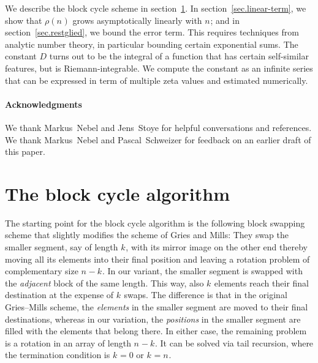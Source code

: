 \documentclass[12pt,a4paper]{article}
\newcommand{\Size}[1][]{n_{#1}}
\newcommand{\Shift}[1][]{k_{#1}}
\newcommand{\AvgCostOf}[1]{\rho(#1)}
\begin{document}
  We describe the block cycle scheme in section~\ref{sec.algorithm}.
  In section~\ref{sec.linear-term}, we show that $\AvgCostOf{\Size}$
  grows asymptotically linearly with $\Size$; and in
  section~\ref{sec.restglied}, we bound the error term.  This requires
  techniques from analytic number theory, in particular bounding certain
  exponential sums. The constant $D$ turns out to be the integral of
  a function that has certain self-similar features, but is
  Riemann-integrable. We compute the constant as an infinite series that
  can be expressed in term of multiple zeta values and estimated
  numerically.

  \paragraph{Acknowledgments}
  We thank Markus~Nebel and Jens~Stoye for helpful conversations and
  references. We thank Markus~Nebel and Pascal~Schweizer for feedback on
  an earlier draft of this paper.

  
  \section{The block cycle algorithm}\label{sec.algorithm}
  The starting point for the block cycle algorithm is the following
  block swapping scheme that slightly modifies the scheme of Gries and
  Mills: They swap the smaller segment, say of length $\Shift$, with its
  mirror image on the other end thereby moving all its elements into
  their final position and leaving a rotation problem of complementary
  size $\Size-\Shift$. In our variant, the smaller segment is swapped
  with the \emph{adjacent} block of the same length. This way, also
  $\Shift$ elements reach their final destination at the expense of
  $\Shift$ swaps.  The difference is that in the original Gries--Mills
  scheme, the \emph{elements} in the smaller segment are moved to their
  final destinations, whereas in our variation, the \emph{positions} in
  the smaller segment are filled with the elements that belong there. In
  either case, the remaining problem is a rotation in an array of length
  $\Size-\Shift$. It can be solved via tail recursion, where the
  termination condition is $\Shift=0$ or $\Shift=\Size$.
\end{document}
